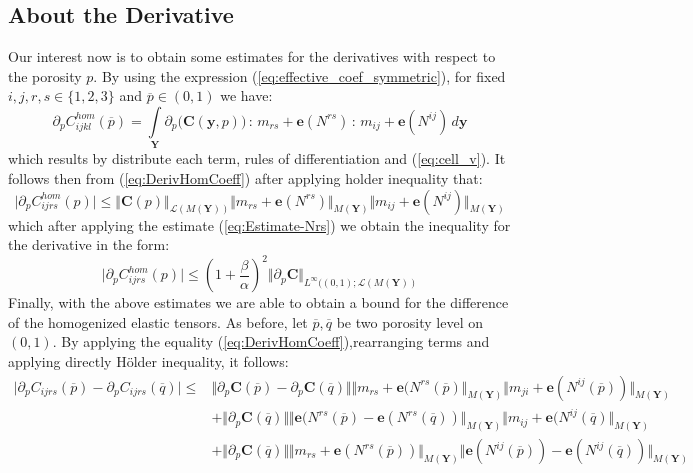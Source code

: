 \subsection{About the Derivative}
Our interest now is to obtain some estimates for the derivatives with respect to the porosity $p$. By using the expression (\ref{eq:effective_coef_symmetric}), for fixed $i,j,r,s \in \{1,2,3\}$ and $\overline{p} \in (0,1)$ we have:
\begin{equation}
    \label{eq:DerivHomCoeff}
    \partial_{p}  C_{ijkl}^{hom} (\overline{p}) = \int\limits_{\mathbf{Y}} \partial_{p}\big( \mathbf{C}(\mathbf{y},p) \big)\, : \,m_{rs}+\mathbf{e}(N^{rs})\, :\,m_{ij}+\mathbf{e}(N^{ij}) \, d\mathbf{y} 
\end{equation}
which results by distribute each term, rules of differentiation and (\ref{eq:cell_v}).
It follows then from (\ref{eq:DerivHomCoeff}) after applying holder inequality that:
\begin{equation*}
    \vert \partial_p C^{hom}_{ijrs}(p) \vert \leq \Vert \mathbf{C}(p) \Vert_{\mathcal{L}(M(\mathbf{Y}))} \Vert m_{rs} + \mathbf{e}(N^{rs}) \Vert_{M(\mathbf{Y})} \Vert m_{ij} + \mathbf{e}(N^{ij}) \Vert_{M(\mathbf{Y})}
\end{equation*}
which after applying the estimate (\ref{eq:Estimate-Nrs}) we obtain the inequality for the derivative in the form:
\begin{equation}
    \label{EstimateDerivHomCoeff}
    \vert \partial_p C^{hom}_{ijrs}(p) \vert \leq (1+\frac{\beta}{\alpha})^2 \Vert \partial_p \mathbf{C}\Vert_{L^{\infty}((0,1); \mathcal{L}(M(\mathbf{Y}))}
\end{equation}
Finally, with the above estimates we are able to obtain a bound for the difference of the homogenized elastic tensors. As before, let $\overline{p}, \overline{q}$ be two porosity level on $(0,1)$.
By applying the equality (\ref{eq:DerivHomCoeff}),rearranging terms and applying directly H\"{o}lder inequality, it follows:
\begin{align*}
    \vert \partial_p C_{ijrs}(\overline{p}) - \partial_p C_{ijrs}(\overline{q}) \vert \leq & \Vert \partial_p \mathbf{C}(\overline{p}) - \partial_p \mathbf{C}(\overline{q}) \Vert \Vert m_{rs} + \mathbf{e}(N^{rs}(\overline{p}) \Vert_{M(\mathbf{Y})} \Vert m_{ji} + \mathbf{e}(N^{ij}(\overline{p}))\Vert_{M(\mathbf{Y})} \\
    & + \Vert \partial_p \mathbf{C}(\overline{q}) \Vert \Vert \mathbf{e}(N^{rs}(\overline{p}) -\mathbf{e}(N^{rs}(\overline{q})) \Vert_{M(\mathbf{Y})} \Vert m_{ij} + \mathbf{e}(N^{ij}(\overline{q}) \Vert_{M(\mathbf{Y})}  \\
    & + \Vert \partial_p \mathbf{C}(\overline{q}) \Vert \Vert m_{rs} + \mathbf{e}(N^{rs}(\overline{p})) \Vert_{M(\mathbf{Y})} \Vert \mathbf{e}(N^{ij}(\overline{p})) - \mathbf{e}(N^{ij}(\overline{q})) \Vert_{M(\mathbf{Y})}
\end{align*}
